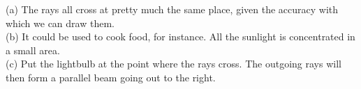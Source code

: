 (a) The rays all cross at pretty much the same place,
given the accuracy with which we can draw them.\\
(b) It could
be used to cook food, for instance. All the sunlight is
concentrated in a small area.\\
(c) Put the lightbulb at the
point where the rays cross. The outgoing rays will then form
a parallel beam going out to the right.

